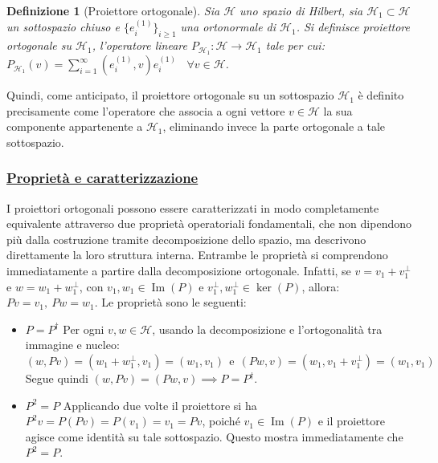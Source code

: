 \documentclass[a4paper,12pt]{report}
\newtheorem{definizione}{Definizione}[chapter]
\begin{document}
\begin{definizione}[Proiettore ortogonale]
    Sia $\mathscr{H}$ uno spazio di Hilbert, sia $\mathscr{H}_1\subset\mathscr{H}$ un sottospazio chiuso e $\{e_i^{(1)}\}_{i\geq 1}$ una ortonormale di $\mathscr{H}_1$. Si definisce proiettore ortogonale su $\mathscr{H}_1$, l'operatore lineare $P_{\mathscr{H}_1}:\mathscr{H}\to\mathscr{H}_1$ tale per cui: $\displaystyle P_{\mathscr{H}_1}(v)=\sum_{i=1}^\infty (e_i^{(1)},v)e_i^{(1)}\ \ \ \ \forall v\in \mathscr{H}$.
\end{definizione}

Quindi, come anticipato, il proiettore ortogonale su un sottospazio $\mathscr{H_1}$ è definito precisamente come l’operatore che associa a ogni vettore $v\in \mathscr{H}$ la sua componente appartenente a $\mathscr{H}_1$, eliminando invece la parte ortogonale a tale sottospazio.

\subsubsection{\underline{Proprietà e caratterizzazione}}

I proiettori ortogonali possono essere caratterizzati in modo completamente equivalente attraverso due proprietà operatoriali fondamentali, che non dipendono più dalla costruzione tramite decomposizione dello spazio, ma descrivono direttamente la loro struttura interna. Entrambe le proprietà si comprendono immediatamente a partire dalla decomposizione ortogonale. Infatti, se \(v=v_1+v_1^\perp\) e \(w=w_1+w_1^\perp\), con \(v_1,w_1\in\operatorname{Im}(P)\) e \(v_1^\perp,w_1^\perp\in\ker(P)\), allora: $Pv=v_1,\ Pw=w_1$. Le proprietà sono le seguenti:

\begin{itemize}
    
    \item $\boxed{P=P^\dagger}$ Per ogni \(v,w\in\mathscr{H}\), usando la decomposizione e l’ortogonalità tra immagine e nucleo: $(w,Pv)=(w_1+w_1^\perp, v_1)=(w_1,v_1)\ \ 
    \text{e}  \ \
    (Pw,v)=(w_1, v_1+v_1^\perp)=(w_1,v_1)$
    Segue quindi $(w,Pv)=(Pw,v) \implies P=P^\dagger$.
    
    \item $\boxed{P^2=P}$ Applicando due volte il proiettore si ha $P^2v = P(Pv)=P(v_1)=v_1=Pv$, poiché \(v_1\in\operatorname{Im}(P)\) e il proiettore agisce come identità su tale sottospazio. Questo mostra immediatamente che \(P^2=P\).
    
\end{itemize}
\end{document}
